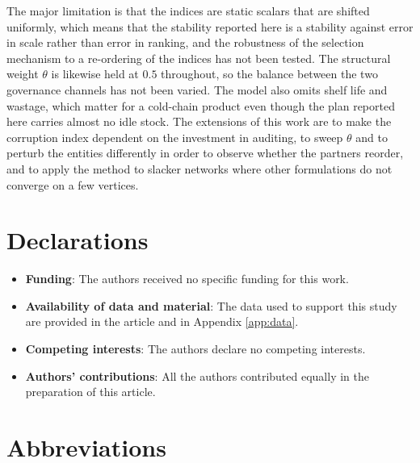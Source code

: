 \documentclass[a4paper]{elsarticle}
\begin{document}
{The major limitation is that the indices are static scalars that are shifted uniformly, which means that the stability reported here is a stability against error in scale rather than error in ranking, and the robustness of the selection mechanism to a re-ordering of the indices has not been tested. The structural weight $\theta$ is likewise held at $0.5$ throughout, so the balance between the two governance channels has not been varied. The model also omits shelf life and wastage, which matter for a cold-chain product even though the plan reported here carries almost no idle stock. The extensions of this work are to make the corruption index dependent on the investment in auditing, to sweep $\theta$ and to perturb the entities differently in order to observe whether the partners reorder, and to apply the method to slacker networks where other formulations do not converge on a few vertices.

\section*{Declarations}
\begin{itemize}
\item \textbf{Funding}: The authors received no specific funding for this work.
\item \textbf{Availability of data and material}: The data used to support this study are provided in the article and in Appendix \ref{app:data}.
\item \textbf{Competing interests}: The authors declare no competing interests.
\item \textbf{Authors' contributions}: All the authors contributed equally in the preparation of this article.
\end{itemize}

\section*{Abbreviations}

}
\end{document}
